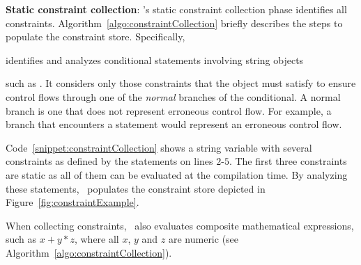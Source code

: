 \begin{mylist}

 \item \textbf{Static constraint collection}: \tool's static constraint
collection phase identifies all constraints.
Algorithm~\ref{algo:constraintCollection} briefly describes the steps to
populate the constraint store. Specifically, \tool\  identifies and analyzes conditional statements involving string
objects  such as . It
considers only those constraints that the object must satisfy to ensure control
flows through one of the \textit{normal} branches of the conditional. A normal
branch is one that does not represent erroneous control flow. For example, a
branch that encounters a statement  would represent an
erroneous control flow. 

Code~\ref{snippet:constraintCollection} shows a string variable with several
constraints as defined by the  statements on lines $2$-$5$. The first
three constraints are static as all of them can be evaluated at the compilation
time. By analyzing these statements, \tool\ populates the constraint store
depicted in Figure~\ref{fig:constraintExample}. 
 When collecting
constraints, \tool\ also evaluates composite mathematical expressions, such as
$x + y * z$, where all $x$, $y$ and $z$ are numeric (see
Algorithm~\ref{algo:constraintCollection}).

\begin{algorithm}[t]
\scriptsize
\DontPrintSemicolon
{}
\end{algorithm}
\end{mylist}
